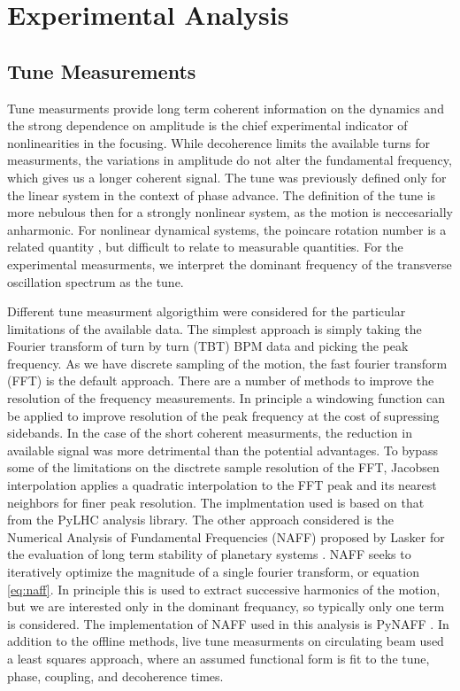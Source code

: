 \chapter{Experimental Analysis} \label{chap:analysis}


\section{Tune Measurements} \label{sec:tune}
Tune measurments provide long term coherent information on the dynamics and the strong dependence on amplitude is the chief experimental indicator of nonlinearities in the focusing. While decoherence limits the available turns for measurments, the variations in amplitude do not alter the fundamental frequency, which gives us a longer coherent signal. The tune was previously defined only for the linear system in the context of phase advance. The definition of the tune is more nebulous then for a strongly nonlinear system, as the motion is neccesarially anharmonic. For nonlinear dynamical systems, the poincare rotation number is a related quantity \cite{nagaitsevBetatron}, but difficult to relate to measurable quantities. For the experimental measurments, we interpret the dominant frequency of the transverse oscillation spectrum as the tune. 

Different tune measurment algorigthim were considered for the particular limitations of the available data. The simplest approach is simply taking the Fourier transform of turn by turn (TBT) BPM data and picking the peak frequency. As we have discrete sampling of the motion, the fast fourier transform (FFT) is the default approach. There are a number of methods to improve the resolution of the frequency measurements. In principle a windowing function can be applied to improve resolution of the peak frequency at the cost of supressing sidebands. In the case of the short coherent measurments, the reduction in available signal was more detrimental than the potential advantages. To bypass some of the limitations on the disctrete sample resolution of the FFT, Jacobsen interpolation \cite{jacobesnLocla} applies a quadratic interpolation to the FFT peak and its nearest neighbors for finer peak resolution. The implmentation used is based on that from the PyLHC \cite{cernomc} analysis library. The other approach considered is the Numerical Analysis of Fundamental Frequencies (NAFF) proposed by Lasker for the evaluation of long term stability of planetary systems \cite{laskar}. NAFF seeks to iteratively optimize the magnitude of a single fourier transform, or equation \ref{eq:naff}. In principle this is used to extract successive harmonics of the motion, but we are interested only in the dominant frequancy, so typically only one term is considered. The implementation of NAFF used in this analysis is PyNAFF \cite{zisopolusPyZ}. In addition to the offline methods, live tune measurments on circulating beam used a least squares approach, where an assumed functional form is fit to the tune, phase, coupling, and decoherence times.

